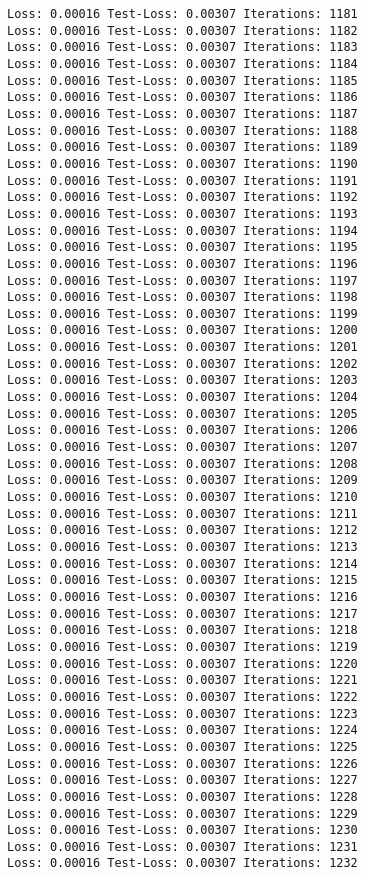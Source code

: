 \documentclass[11pt]{article}
\begin{document}
\begin{Verbatim}[commandchars=\\\{\}]
Loss: 0.00016 Test-Loss: 0.00307 Iterations: 1181
Loss: 0.00016 Test-Loss: 0.00307 Iterations: 1182
Loss: 0.00016 Test-Loss: 0.00307 Iterations: 1183
Loss: 0.00016 Test-Loss: 0.00307 Iterations: 1184
Loss: 0.00016 Test-Loss: 0.00307 Iterations: 1185
Loss: 0.00016 Test-Loss: 0.00307 Iterations: 1186
Loss: 0.00016 Test-Loss: 0.00307 Iterations: 1187
Loss: 0.00016 Test-Loss: 0.00307 Iterations: 1188
Loss: 0.00016 Test-Loss: 0.00307 Iterations: 1189
Loss: 0.00016 Test-Loss: 0.00307 Iterations: 1190
Loss: 0.00016 Test-Loss: 0.00307 Iterations: 1191
Loss: 0.00016 Test-Loss: 0.00307 Iterations: 1192
Loss: 0.00016 Test-Loss: 0.00307 Iterations: 1193
Loss: 0.00016 Test-Loss: 0.00307 Iterations: 1194
Loss: 0.00016 Test-Loss: 0.00307 Iterations: 1195
Loss: 0.00016 Test-Loss: 0.00307 Iterations: 1196
Loss: 0.00016 Test-Loss: 0.00307 Iterations: 1197
Loss: 0.00016 Test-Loss: 0.00307 Iterations: 1198
Loss: 0.00016 Test-Loss: 0.00307 Iterations: 1199
Loss: 0.00016 Test-Loss: 0.00307 Iterations: 1200
Loss: 0.00016 Test-Loss: 0.00307 Iterations: 1201
Loss: 0.00016 Test-Loss: 0.00307 Iterations: 1202
Loss: 0.00016 Test-Loss: 0.00307 Iterations: 1203
Loss: 0.00016 Test-Loss: 0.00307 Iterations: 1204
Loss: 0.00016 Test-Loss: 0.00307 Iterations: 1205
Loss: 0.00016 Test-Loss: 0.00307 Iterations: 1206
Loss: 0.00016 Test-Loss: 0.00307 Iterations: 1207
Loss: 0.00016 Test-Loss: 0.00307 Iterations: 1208
Loss: 0.00016 Test-Loss: 0.00307 Iterations: 1209
Loss: 0.00016 Test-Loss: 0.00307 Iterations: 1210
Loss: 0.00016 Test-Loss: 0.00307 Iterations: 1211
Loss: 0.00016 Test-Loss: 0.00307 Iterations: 1212
Loss: 0.00016 Test-Loss: 0.00307 Iterations: 1213
Loss: 0.00016 Test-Loss: 0.00307 Iterations: 1214
Loss: 0.00016 Test-Loss: 0.00307 Iterations: 1215
Loss: 0.00016 Test-Loss: 0.00307 Iterations: 1216
Loss: 0.00016 Test-Loss: 0.00307 Iterations: 1217
Loss: 0.00016 Test-Loss: 0.00307 Iterations: 1218
Loss: 0.00016 Test-Loss: 0.00307 Iterations: 1219
Loss: 0.00016 Test-Loss: 0.00307 Iterations: 1220
Loss: 0.00016 Test-Loss: 0.00307 Iterations: 1221
Loss: 0.00016 Test-Loss: 0.00307 Iterations: 1222
Loss: 0.00016 Test-Loss: 0.00307 Iterations: 1223
Loss: 0.00016 Test-Loss: 0.00307 Iterations: 1224
Loss: 0.00016 Test-Loss: 0.00307 Iterations: 1225
Loss: 0.00016 Test-Loss: 0.00307 Iterations: 1226
Loss: 0.00016 Test-Loss: 0.00307 Iterations: 1227
Loss: 0.00016 Test-Loss: 0.00307 Iterations: 1228
Loss: 0.00016 Test-Loss: 0.00307 Iterations: 1229
Loss: 0.00016 Test-Loss: 0.00307 Iterations: 1230
Loss: 0.00016 Test-Loss: 0.00307 Iterations: 1231
Loss: 0.00016 Test-Loss: 0.00307 Iterations: 1232

\end{Verbatim}
\end{document}

